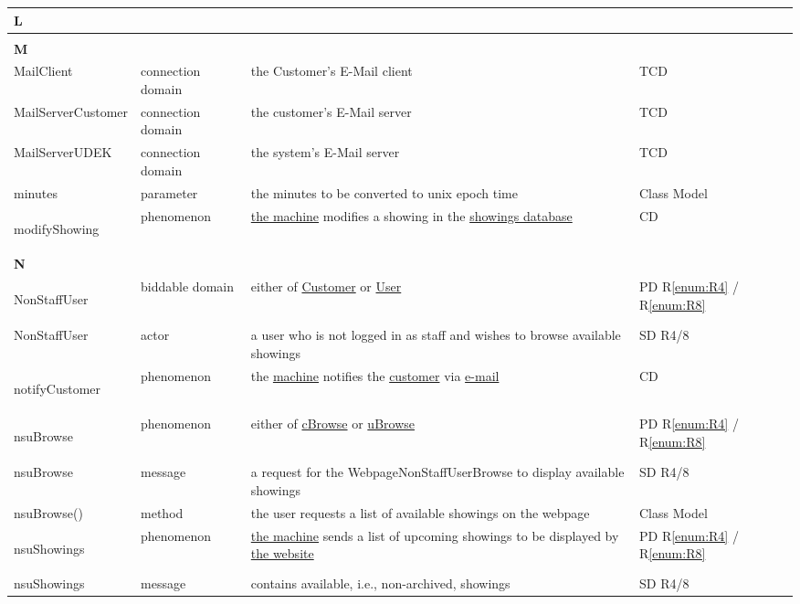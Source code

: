 \documentclass[a4paper,10pt,titlepage,bibtotoc,bibtotocnumbered]{scrreprt}
\begin{document}
\begin{longtable}{|p{4.75cm}|p{3cm}|p{5cm}|l|}
\hline
\multicolumn{4}{|l|}{\textbf{L}}\\
\hline
&  &  & \\
\hline
\multicolumn{4}{|l|}{\textbf{M}}\\
\hline
MailClient & connection domain & the Customer's E-Mail client & TCD\\
\hline
MailServerCustomer & connection domain & the customer's E-Mail server & TCD\\
\hline
MailServerUDEK & connection domain & the system's E-Mail server & TCD\\
\hline
minutes & parameter & the minutes to be converted to unix epoch time & Class Model\\
\hline
\hypertarget{glossary:modifyShowing}{modifyShowing} & phenomenon & \hyperlink{glossary:UDEKino}{the machine} modifies a showing in the \hyperlink{glossary:Showing}{showings database} & CD\\
\hline
\multicolumn{4}{|l|}{\textbf{N}}\\
\hline
\hypertarget{glossary:NonStaffUser}{NonStaffUser} & biddable domain & either of \hyperlink{glossary:Customer}{Customer} or \hyperlink{glossary:User}{User} & PD R\ref{enum:R4} / R\ref{enum:R8}\\
\hline
NonStaffUser & actor & a user who is not logged in as staff and wishes to browse available showings & SD R4/8\\
\hline
\hypertarget{glossary:notifyCustomer}{notifyCustomer} & phenomenon & the \hyperlink{glossary:UDEKino}{machine} notifies the \hyperlink{glossary:Customer}{customer} via \hyperlink{glossary:Email}{e-mail} & CD\\
\hline
\hypertarget{glossary:nsuBrowse}{nsuBrowse} & phenomenon & either of \hyperlink{glossary:cBrowse}{cBrowse} or \hyperlink{glossary:uBrowse}{uBrowse} & PD R\ref{enum:R4} / R\ref{enum:R8}\\
\hline
nsuBrowse & message & a request for the WebpageNonStaffUserBrowse to display available showings & SD R4/8\\
\hline
nsuBrowse() & method & the user requests a list of available showings on the webpage & Class Model\\
\hline
\hypertarget{glossary:nsuShowings}{nsuShowings} & phenomenon & \hyperlink{glossary:UDEK-NonStaffUserBrowse}{the machine} sends a list of upcoming showings to be displayed by \hyperlink{glossary:WebPageNonStaffUserBrowse}{the website} & PD R\ref{enum:R4} / R\ref{enum:R8}\\
\hline
nsuShowings & message & contains available, i.e., non-archived, showings & SD R4/8\\

\end{longtable}
\end{document}
